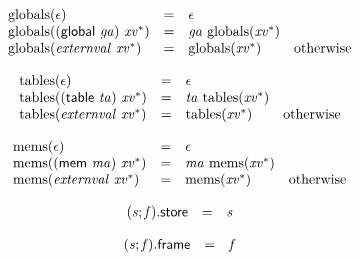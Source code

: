 $$
\begin{array}{@{}lcl@{}l@{}}
{\mathrm{globals}}(\epsilon) &=& \epsilon &  \\
{\mathrm{globals}}((\mathsf{global}~{\mathit{ga}})~{{\mathit{xv}}^\ast}) &=& {\mathit{ga}}~{\mathrm{globals}}({{\mathit{xv}}^\ast}) &  \\
{\mathrm{globals}}({\mathit{externval}}~{{\mathit{xv}}^\ast}) &=& {\mathrm{globals}}({{\mathit{xv}}^\ast}) &\quad
  \mbox{otherwise} \\
\end{array}
$$

$$
\begin{array}{@{}lcl@{}l@{}}
{\mathrm{tables}}(\epsilon) &=& \epsilon &  \\
{\mathrm{tables}}((\mathsf{table}~{\mathit{ta}})~{{\mathit{xv}}^\ast}) &=& {\mathit{ta}}~{\mathrm{tables}}({{\mathit{xv}}^\ast}) &  \\
{\mathrm{tables}}({\mathit{externval}}~{{\mathit{xv}}^\ast}) &=& {\mathrm{tables}}({{\mathit{xv}}^\ast}) &\quad
  \mbox{otherwise} \\
\end{array}
$$

$$
\begin{array}{@{}lcl@{}l@{}}
{\mathrm{mems}}(\epsilon) &=& \epsilon &  \\
{\mathrm{mems}}((\mathsf{mem}~{\mathit{ma}})~{{\mathit{xv}}^\ast}) &=& {\mathit{ma}}~{\mathrm{mems}}({{\mathit{xv}}^\ast}) &  \\
{\mathrm{mems}}({\mathit{externval}}~{{\mathit{xv}}^\ast}) &=& {\mathrm{mems}}({{\mathit{xv}}^\ast}) &\quad
  \mbox{otherwise} \\
\end{array}
$$

\vspace{1ex}

\vspace{1ex}

$$
\begin{array}{@{}lcl@{}l@{}}
({\mathit{s}} ; {\mathit{f}}).\mathsf{store} &=& {\mathit{s}} &  \\
\end{array}
$$

$$
\begin{array}{@{}lcl@{}l@{}}
({\mathit{s}} ; {\mathit{f}}).\mathsf{frame} &=& {\mathit{f}} &  \\
\end{array}
$$

\vspace{1ex}

